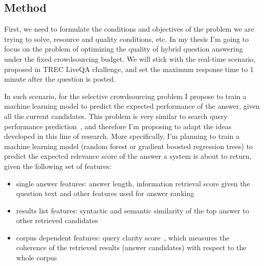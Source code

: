 
\subsection{Method}
\label{section:crowdsourcing:method}

First, we need to formulate the conditions and objectives of the problem we are trying to solve, \ie resource and quality conditions, etc.
In my thesis I'm going to focus on the problem of optimizing the quality of hybrid question answering under the fixed crowdsourcing budget.
We will stick with the real-time scenario, proposed in TREC LiveQA challenge, and set the maximum response time to 1 minute after the question is posted.

In such scenario, for the selective crowdsourcing problem I propose to train a machine learning model to predict the expected performance of the answer, given all the current candidates.
This problem is very similar to search query performance prediction~\cite{carmel2010estimating,he2006query,zhou2007query}, and therefore I'm proposing to adapt the ideas developed in this line of research.
More specifically, I'm planning to train a machine learning model (\eg random forest or gradient boosted regression trees) to predict the expected relevance score of the answer a system is about to return, given the following set of features:
\begin{itemize}
\item single answer features: answer length, information retrieval score given the question text and other features used for answer ranking
\item results list features: syntactic and semantic similarity of the top answer to other retrieved candidates
\item corpus dependent features: query clarity score~\cite{cronen2002predicting}, which measures the coherence of the retrieved results (answer candidates) with respect to the whole corpus
\end{itemize}

